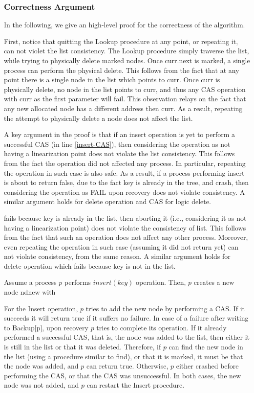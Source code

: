 \newpage
\subsubsection*{Correctness Argument}
In the following, we give an high-level proof for the correctness of the algorithm.

First, notice that quitting the Lookup procedure at any point, or repeating it, can not violet the list consistency. The Lookup procedure simply traverse the list, while trying to physically delete marked nodes.
Once curr.next is marked, a single process can perform the physical delete. This follows from the fact that at any point there is a single node in the list which points to curr. Once curr is physically delete, no node in the list points to curr, and thus any CAS operation with curr as the first parameter will fail. This observation relays on the fact that any new allocated node has a different address then curr.
As a result, repeating the attempt to physically delete a node does not affect the list.

A key argument in the proof is that if an insert operation is yet to perform a successful CAS (in line \ref{insert-CAS}), then considering the operation as not having a linearization point does not violate the list consistency. This follows from the fact the operation did not affected any process. In particular, repeating the operation in such case is also safe. As a result, if a process performing insert is about to return false, due to the fact key is already in the tree, and crash, then considering the operation as FAIL upon recovery does not violate consistency.
A similar argument holds for delete operation and CAS for logic delete.

fails because key is already in the list, then aborting it (i.e., considering it as not having a linearization point) does not violate the consistency of list. This follows from the fact that such an operation does not affect any other process. Moreover, even repeating the operation in such case (assuming it did not return yet) can not violate consistency, from the same reason. A similar argument holds for delete operation which fails because key is not in the list.

Assume a process $p$ performs $insert(key)$ operation. Then, $p$ creates a new node ndnew with 

For the Insert operation, $p$ tries to add the new node by performing a CAS. If it succeeds it will return true if it suffers no failure. In case of a failure after writing to Backup[p], upon recovery $p$ tries to complete its operation. If it already performed a successful CAS, that is, the node was added to the list, then either it is still in the list or that it was deleted. Therefore, if $p$ can find the new node in the list (using a procedure similar to find), or that it is marked, it must be that the node was added, and $p$ can return true. Otherwise, $p$ either crashed before performing the CAS, or that the CAS was unsuccessful. In both cases, the new node was not added, and $p$ can restart the Insert procedure.

